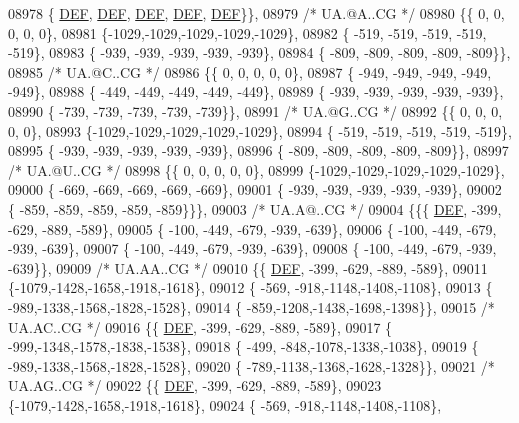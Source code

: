 \begin{DoxyCode}
08978 \{  \mbox{\hyperlink{1_88_84__epars_8h_a397419fc12b37ed479c8abb9d444d843}{DEF}},  \mbox{\hyperlink{1_88_84__epars_8h_a397419fc12b37ed479c8abb9d444d843}{DEF}},  \mbox{\hyperlink{1_88_84__epars_8h_a397419fc12b37ed479c8abb9d444d843}{DEF}},  \mbox{\hyperlink{1_88_84__epars_8h_a397419fc12b37ed479c8abb9d444d843}{DEF}},  \mbox{\hyperlink{1_88_84__epars_8h_a397419fc12b37ed479c8abb9d444d843}{DEF}}\}\},
08979 \textcolor{comment}{/* UA.@A..CG */}
08980 \{\{    0,    0,    0,    0,    0\},
08981 \{-1029,-1029,-1029,-1029,-1029\},
08982 \{ -519, -519, -519, -519, -519\},
08983 \{ -939, -939, -939, -939, -939\},
08984 \{ -809, -809, -809, -809, -809\}\},
08985 \textcolor{comment}{/* UA.@C..CG */}
08986 \{\{    0,    0,    0,    0,    0\},
08987 \{ -949, -949, -949, -949, -949\},
08988 \{ -449, -449, -449, -449, -449\},
08989 \{ -939, -939, -939, -939, -939\},
08990 \{ -739, -739, -739, -739, -739\}\},
08991 \textcolor{comment}{/* UA.@G..CG */}
08992 \{\{    0,    0,    0,    0,    0\},
08993 \{-1029,-1029,-1029,-1029,-1029\},
08994 \{ -519, -519, -519, -519, -519\},
08995 \{ -939, -939, -939, -939, -939\},
08996 \{ -809, -809, -809, -809, -809\}\},
08997 \textcolor{comment}{/* UA.@U..CG */}
08998 \{\{    0,    0,    0,    0,    0\},
08999 \{-1029,-1029,-1029,-1029,-1029\},
09000 \{ -669, -669, -669, -669, -669\},
09001 \{ -939, -939, -939, -939, -939\},
09002 \{ -859, -859, -859, -859, -859\}\}\},
09003 \textcolor{comment}{/* UA.A@..CG */}
09004 \{\{\{  \mbox{\hyperlink{1_88_84__epars_8h_a397419fc12b37ed479c8abb9d444d843}{DEF}}, -399, -629, -889, -589\},
09005 \{ -100, -449, -679, -939, -639\},
09006 \{ -100, -449, -679, -939, -639\},
09007 \{ -100, -449, -679, -939, -639\},
09008 \{ -100, -449, -679, -939, -639\}\},
09009 \textcolor{comment}{/* UA.AA..CG */}
09010 \{\{  \mbox{\hyperlink{1_88_84__epars_8h_a397419fc12b37ed479c8abb9d444d843}{DEF}}, -399, -629, -889, -589\},
09011 \{-1079,-1428,-1658,-1918,-1618\},
09012 \{ -569, -918,-1148,-1408,-1108\},
09013 \{ -989,-1338,-1568,-1828,-1528\},
09014 \{ -859,-1208,-1438,-1698,-1398\}\},
09015 \textcolor{comment}{/* UA.AC..CG */}
09016 \{\{  \mbox{\hyperlink{1_88_84__epars_8h_a397419fc12b37ed479c8abb9d444d843}{DEF}}, -399, -629, -889, -589\},
09017 \{ -999,-1348,-1578,-1838,-1538\},
09018 \{ -499, -848,-1078,-1338,-1038\},
09019 \{ -989,-1338,-1568,-1828,-1528\},
09020 \{ -789,-1138,-1368,-1628,-1328\}\},
09021 \textcolor{comment}{/* UA.AG..CG */}
09022 \{\{  \mbox{\hyperlink{1_88_84__epars_8h_a397419fc12b37ed479c8abb9d444d843}{DEF}}, -399, -629, -889, -589\},
09023 \{-1079,-1428,-1658,-1918,-1618\},
09024 \{ -569, -918,-1148,-1408,-1108\},

\end{DoxyCode}
